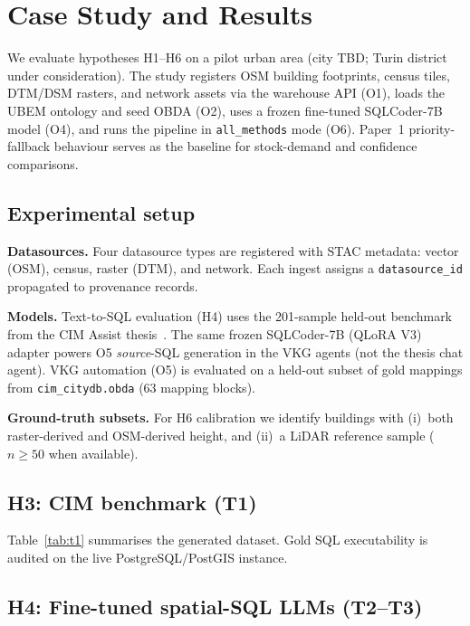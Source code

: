 \section{Case Study and Results}
\label{sec:casestudy}

We evaluate hypotheses H1--H6 on a pilot urban area (city TBD; Turin district under consideration).
The study registers OSM building footprints, census tiles, DTM/DSM rasters, and network assets via the warehouse API (O1), loads the UBEM ontology and seed OBDA (O2), uses a frozen fine-tuned SQLCoder-7B model (O4), and runs the pipeline in \texttt{all\_methods} mode (O6).
Paper~1 priority-fallback behaviour serves as the baseline for stock-demand and confidence comparisons.

\subsection{Experimental setup}

\textbf{Datasources.}
Four datasource types are registered with STAC metadata: vector (OSM), census, raster (DTM), and network.
Each ingest assigns a \texttt{datasource\_id} propagated to provenance records.

\textbf{Models.}
Text-to-SQL evaluation (H4) uses the 201-sample held-out benchmark from the CIM Assist thesis~\cite{taherdoust2025cimassist}.
The same frozen SQLCoder-7B (QLoRA V3) adapter powers O5 \emph{source}-SQL generation in the VKG agents (not the thesis chat agent).
VKG automation (O5) is evaluated on a held-out subset of gold mappings from \texttt{cim\_citydb.obda} (63 mapping blocks).

\textbf{Ground-truth subsets.}
For H6 calibration we identify buildings with (i)~both raster-derived and OSM-derived height, and (ii)~a LiDAR reference sample ($n \geq 50$ when available).

\subsection{H3: CIM benchmark (T1)}

Table~\ref{tab:t1} summarises the generated dataset.
Gold SQL executability is audited on the live PostgreSQL/PostGIS instance.



\subsection{H4: Fine-tuned spatial-SQL LLMs (T2--T3)}

